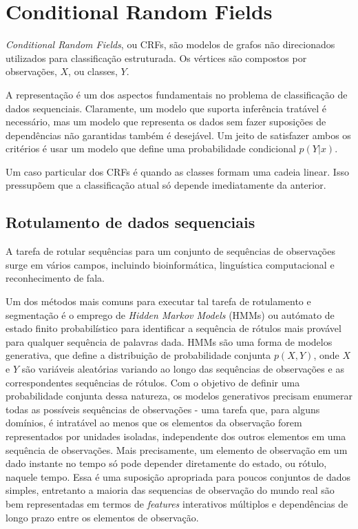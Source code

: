 \section{Conditional Random Fields}

\textit{Conditional Random Fields}, ou CRFs, são modelos de grafos não direcionados
utilizados para classificação estruturada. Os vértices são compostos por
observações, $X$, ou classes, $Y$.

A representação é um dos aspectos fundamentais no problema de classificação de
dados sequenciais. Claramente, um modelo que suporta inferência tratável é
necessário, mas um modelo que representa os dados sem fazer suposições de
dependências não garantidas também é desejável. Um jeito de satisfazer ambos
os critérios é usar um modelo que define uma probabilidade condicional
$p(Y|x)$.

Um caso particular dos CRFs é quando as classes formam uma cadeia linear.
Isso pressupõem que a classificação atual só depende imediatamente da
anterior.

%
%

\subsection{Rotulamento de dados sequenciais}

A tarefa de rotular sequências para um conjunto de sequências de observações
surge em vários campos, incluindo bioinformática, linguística computacional
e reconhecimento de fala.

Um dos métodos mais comuns para executar tal tarefa de rotulamento e segmentação
é o emprego de \textit{Hidden Markov Models} (HMMs) ou autómato de estado finito
probabilístico para identificar a sequência de rótulos mais provável para qualquer
sequência de palavras dada. HMMs são uma forma de modelos generativa, que define
a distribuição de probabilidade conjunta $p(X,Y)$, onde $X$ e $Y$ são variáveis
aleatórias variando ao longo das sequências de observações e as correspondentes
sequências de rótulos. Com o objetivo de definir uma probabilidade conjunta dessa
natureza, os modelos generativos precisam enumerar todas as possíveis sequências de
observações - uma tarefa que, para alguns domínios, é intratável ao menos que os
elementos da observação forem representados por unidades isoladas, independente dos
outros elementos em uma sequência de observações. Mais precisamente, um elemento
de observação em um dado instante no tempo só pode depender diretamente do estado,
ou rótulo, naquele tempo. Essa é uma suposição apropriada para poucos conjuntos de
dados simples, entretanto a maioria das sequencias de observação do mundo real são
bem representadas em termos de \textit{features} interativos múltiplos e dependências
de longo prazo entre os elementos de observação.


